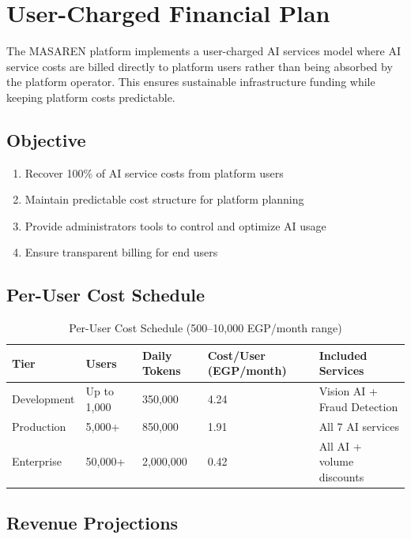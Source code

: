 \documentclass[11pt,a4paper]{article}
\begin{document}
\section{User-Charged Financial Plan}

The MASAREN platform implements a user-charged AI services model where AI service costs are billed directly to platform users rather than being absorbed by the platform operator. This ensures sustainable infrastructure funding while keeping platform costs predictable.

\subsection{Objective}

\begin{enumerate}[leftmargin=2em]
    \item Recover 100\% of AI service costs from platform users
    \item Maintain predictable cost structure for platform planning
    \item Provide administrators tools to control and optimize AI usage
    \item Ensure transparent billing for end users
\end{enumerate}

\subsection{Per-User Cost Schedule}

\begin{table}[H]
\centering
\begin{tabular}{|l|l|l|l|l|}
\hline
\textbf{Tier} & \textbf{Users} & \textbf{Daily Tokens} & \textbf{Cost/User (EGP/month)} & \textbf{Included Services} \\
\hline
Development & Up to 1,000 & 350,000 & 4.24 & Vision AI + Fraud Detection \\
\hline
Production & 5,000+ & 850,000 & 1.91 & All 7 AI services \\
\hline
Enterprise & 50,000+ & 2,000,000 & 0.42 & All AI + volume discounts \\
\hline
\end{tabular}
\caption{Per-User Cost Schedule (500--10,000 EGP/month range)}
\end{table}

\subsection{Revenue Projections}
\end{document}

